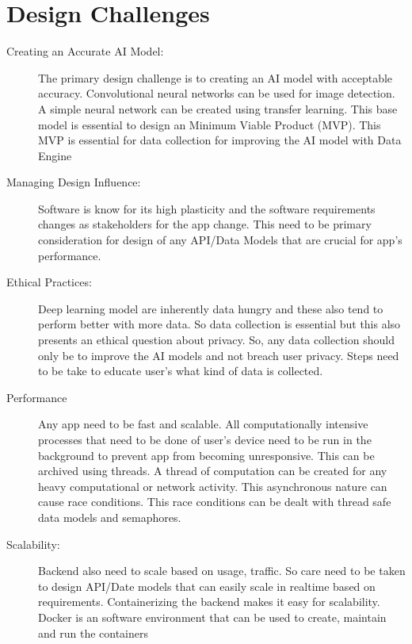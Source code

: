 \documentclass[../Report.tex]{subfiles}
\begin{document}
\section{Design Challenges}
\begin{description}
    \item[Creating an Accurate AI Model: ] The primary design challenge is to creating an AI model with acceptable accuracy. Convolutional
    neural networks can be used for image detection. A simple neural network can be created using transfer learning. This base model is 
    essential to design an Minimum Viable Product (MVP). This MVP is essential for data collection for improving the AI model with Data 
    Engine
    
    \item[Managing Design Influence: ] Software is know for its high plasticity and the software requirements changes as stakeholders for
    the app change. This need to be primary consideration for design of any API/Data Models that are crucial for app's performance.

    \item[Ethical Practices: ] Deep learning model are inherently data hungry and these also tend to perform better with more data. So
    data collection is essential but this also presents an ethical question about privacy. So, any data collection should only be to 
    improve the AI models and not breach user privacy. Steps need to be take to educate user's what kind of data is collected.

    \item[Performance] Any app need to be fast and scalable. All computationally intensive processes that need to be 
    done of user's device need to be run in the background to prevent app from becoming unresponsive. This can be archived using 
    threads. A thread of computation can be created for any heavy computational or network activity. This asynchronous nature can 
    cause race conditions. This race conditions can be dealt with thread safe data models and semaphores.
    
    \item[Scalability: ]
    Backend also need to scale based on usage, traffic. So care need to be taken to design API/Date models that can easily scale in 
    realtime based on requirements. Containerizing the backend makes it easy for scalability. Docker is an software environment that
    can be used to create, maintain and run the containers
\end{description}
\end{document}
